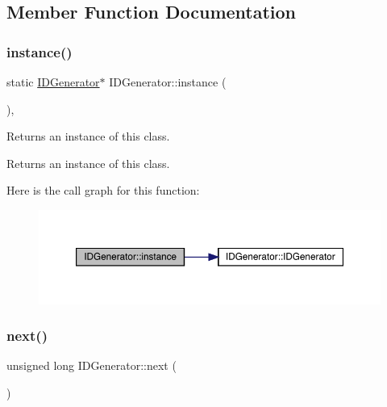 \subsection{Member Function Documentation}
\mbox{\label{class_i_d_generator_ad852c6dadc89e1020e4b3932f5a97bb3}} 
\subsubsection{\texorpdfstring{instance()}{instance()}}
{\footnotesize\ttfamily static \mbox{\hyperlink{class_i_d_generator}{I\+D\+Generator}}$\ast$ I\+D\+Generator\+::instance (\begin{DoxyParamCaption}{ }\end{DoxyParamCaption})\hspace{0.3cm}{\ttfamily [inline]}, {\ttfamily [static]}}

Returns an instance of this class. \begin{DoxyReturn}{Returns}
an instance of this class. 
\end{DoxyReturn}
Here is the call graph for this function\+:
\nopagebreak
\begin{figure}[H]
\begin{center}
\leavevmode
\includegraphics[width=350pt]{class_i_d_generator_ad852c6dadc89e1020e4b3932f5a97bb3_cgraph}
\end{center}
\end{figure}
\mbox{\label{class_i_d_generator_a99d8cabb2ec6a17888a8ccbe9c85fee0}} 
\subsubsection{\texorpdfstring{next()}{next()}}
{\footnotesize\ttfamily unsigned long I\+D\+Generator\+::next (\begin{DoxyParamCaption}{ }\end{DoxyParamCaption})\hspace{0.3cm}{\ttfamily [inline]}}

